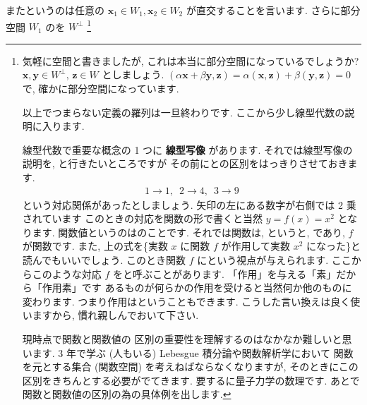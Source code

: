\documentclass[openany, a4paper, oneside]{jsbook}
\begin{document}
またというのは任意の $\bm{x}_1 \in W_1,\bm{x}_2 \in W_2$ が直交することを言います.
さらに部分空間 $W_1$ のを $W^{\perp}$ \footnote{気軽に空間と書きましたが, これは本当に部分空間になっているでしょうか?
$\bm{x},\bm{y} \in W^{\perp},\, \bm{z} \in W$ としましょう.
$(\alpha \bm{x} + \beta\bm{y},\bm{z}) = \alpha (\bm{x},\bm{z}) + \beta (\bm{y},\bm{z}) =0$
で, 確かに部分空間になっています.

以上でつまらない定義の羅列は一旦終わりです.
ここから少し線型代数の説明に入ります.

線型代数で重要な概念の 1 つに \textbf{線型写像} があります.
それでは線型写像の説明を, と行きたいところですが
その前にとの区別をはっきりさせておきます.
\begin{align}
1 \longrightarrow 1 ,\,\,\, 2 \longrightarrow 4 ,\,\,\, 3 \longrightarrow 9
\end{align}
という対応関係があったとしましょう. 矢印の左にある数字が右側では 2 乗されています
このときの対応を関数の形で書くと当然 $y = f (x) = x^{2}$ となります.
関数値というのはのことです. それでは関数は, というと,
であり,  $f$ が関数です.
また, 上の式を\textgt\{実数 $x$ に関数 $f$ が作用して実数 $x^{2}$ になった\}と読んでもいいでしょう.
このとき関数 $f$ にという視点が与えられます.
ここからこのような対応 $f$ をと呼ぶことがあります.
「作用」を与える「素」だから「作用素」です
あるものが何らかの作用を受けると当然何か他のものに変わります.
つまり作用はということもできます.
こうした言い換えは良く使いますから, 慣れ親しんでおいて下さい.

現時点で関数と関数値の
区別の重要性を理解するのはなかなか難しいと思います. 3 年で学ぶ (人もいる) Lebesgue 積分論や関数解析学において
関数を元とする集合 (関数空間) を考えねばならなくなりますが, そのときにこの区別をきちんとする必要がでてきます.
要するに量子力学の数理です.
あとで関数と関数値の区別の為の具体例を出します.

}
\end{document}
